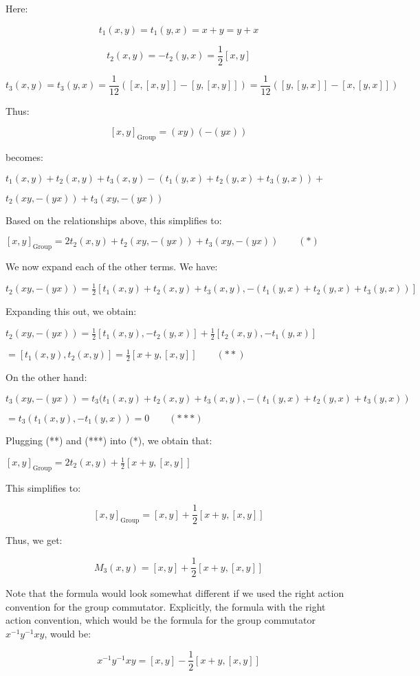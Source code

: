 Here:

$$t_1(x,y) = t_1(y,x) = x + y = y + x$$

$$t_2(x,y) = -t_2(y,x) = \frac{1}{2}[x,y]$$

$$t_3(x,y) = t_3(y,x) = \frac{1}{12}([x,[x,y]] - [y,[x,y]]) = \frac{1}{12}([y,[y,x]] - [x,[y,x]])$$

Thus:

$$[x,y]_{\text{Group}} = (xy)(-(yx))$$

becomes:

$t_1(x,y) + t_2(x,y) + t_3(x,y) - (t_1(y,x) + t_2(y,x) + t_3(y,x)) +$

$t_2(xy,-(yx)) + t_3(xy,-(yx))$

Based on the relationships above, this simplifies to:

$[x,y]_{\text{Group}} = 2t_2(x,y) + t_2(xy,-(yx)) + t_3(xy,-(yx)) \qquad (*)$

We now expand each of the other terms. We have:

$t_2(xy,-(yx)) = \frac{1}{2}\left[t_1(x,y) + t_2(x,y) + t_3(x,y),- (t_1(y,x) + t_2(y,x) + t_3(y,x))\right]$

Expanding this out, we obtain:

$t_2(xy,-(yx)) = \frac{1}{2}[t_1(x,y),-t_2(y,x)] + \frac{1}{2}[t_2(x,y), -t_1(y,x)]$

$ = [t_1(x,y),t_2(x,y)] = \frac{1}{2}[x + y,[x,y]] \qquad (**)$

On the other hand:

$t_3(xy,-(yx)) = t_3(t_1(x,y) + t_2(x,y) + t_3(x,y),-(t_1(y,x) + t_2(y,x) + t_3(y,x))$

$ = t_3(t_1(x,y),-t_1(y,x)) = 0 \qquad (***) $

Plugging (**) and (***) into (*), we obtain that:

$[x,y]_{\text{Group}} = 2t_2(x,y) + \frac{1}{2}[x + y,[x,y]]$

This simplifies to:

$$[x,y]_{\text{Group}} = [x,y] + \frac{1}{2}[x + y,[x,y]]$$

Thus, we get:

$$M_3(x,y) = [x,y] + \frac{1}{2}[x + y,[x,y]]$$

Note that the formula would look somewhat different if we used the
right action convention for the group commutator. Explicitly, the
formula with the right action convention, which would be the formula
for the group commutator $x^{-1}y^{-1}xy$, would be:

$$x^{-1}y^{-1}xy = [x,y] - \frac{1}{2}[x + y,[x,y]]$$

